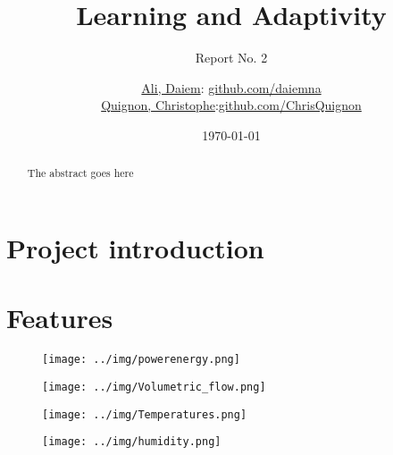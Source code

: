 \documentclass{scrartcl}
\begin{document}
\title{Learning and Adaptivity}
\subtitle{Report No. 2}
\author{
  \href{daiem.ali@smail.inf.h-brs.de}{Ali, Daiem}: \href{https://github.com/daiemna}{github.com/daiemna}\\
  \href{christophe.quignon@smail.inf.h-brs.de}{Quignon, Christophe}:\href{https://github.com/ChrisQuignon}{github.com/ChrisQuignon}
}
\date{\today}


\maketitle



\begin{abstract}
The abstract goes here
\end{abstract}


\section{Project introduction}


\section{Features}


\begin{figure}[H]
  \centering
  \texttt{[image: ../img/powerenergy.png]}
  \caption{}
\end{figure}

\begin{figure}[H]
  \centering
  \texttt{[image: ../img/Volumetric\_flow.png]}
  \caption{}
\end{figure}

\begin{figure}[H]
  \centering
  \texttt{[image: ../img/Temperatures.png]}
  \caption{}
\end{figure}

\begin{figure}[H]
  \centering
  \texttt{[image: ../img/humidity.png]}
  \caption{}
\end{figure}
\end{document}
